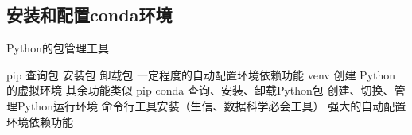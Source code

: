\subsection{安装和配置conda环境}
\begin{frame}{Python的包管理工具}
    \begin{myoutline}
        \1 pip
            \2 查询包
            \2 安装包
            \2 卸载包
            \2 一定程度的自动配置环境依赖功能
        \1 venv
            \2 创建 Python 的虚拟环境
            \2 其余功能类似 pip
        \1 conda
            \2 查询、安装、卸载Python包
            \2 创建、切换、管理Python运行环境
            \2 命令行工具安装（生信、数据科学必会工具）
            \2 强大的自动配置环境依赖功能
    \end{myoutline}
\end{frame}


